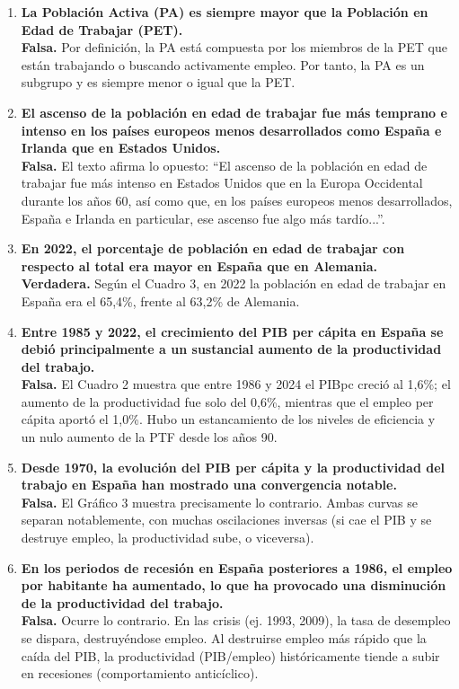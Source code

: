 \begin{enumerate}[label=\arabic*., resume=preguntas]
    \item \textbf{La Población Activa (PA) es siempre mayor que la Población en Edad de Trabajar (PET).} \\
    \textbf{Falsa.} Por definición, la PA está compuesta por los miembros de la PET que están trabajando o buscando activamente empleo. Por tanto, la PA es un subgrupo y es siempre menor o igual que la PET.

    \item \textbf{El ascenso de la población en edad de trabajar fue más temprano e intenso en los países europeos menos desarrollados como España e Irlanda que en Estados Unidos.} \\
    \textbf{Falsa.} El texto afirma lo opuesto: ``El ascenso de la población en edad de trabajar fue más intenso en Estados Unidos que en la Europa Occidental durante los años 60, así como que, en los países europeos menos desarrollados, España e Irlanda en particular, ese ascenso fue algo más tardío...''.

    \item \textbf{En 2022, el porcentaje de población en edad de trabajar con respecto al total era mayor en España que en Alemania.} \\
    \textbf{Verdadera.} Según el Cuadro 3, en 2022 la población en edad de trabajar en España era el 65,4\%, frente al 63,2\% de Alemania.

    \item \textbf{Entre 1985 y 2022, el crecimiento del PIB per cápita en España se debió principalmente a un sustancial aumento de la productividad del trabajo.} \\
    \textbf{Falsa.} El Cuadro 2 muestra que entre 1986 y 2024 el PIBpc creció al 1,6\%; el aumento de la productividad fue solo del 0,6\%, mientras que el empleo per cápita aportó el 1,0\%. Hubo un estancamiento de los niveles de eficiencia y un nulo aumento de la PTF desde los años 90.

    \item \textbf{Desde 1970, la evolución del PIB per cápita y la productividad del trabajo en España han mostrado una convergencia notable.} \\
    \textbf{Falsa.} El Gráfico 3 muestra precisamente lo contrario. Ambas curvas se separan notablemente, con muchas oscilaciones inversas (si cae el PIB y se destruye empleo, la productividad sube, o viceversa).

    \item \textbf{En los periodos de recesión en España posteriores a 1986, el empleo por habitante ha aumentado, lo que ha provocado una disminución de la productividad del trabajo.} \\
    \textbf{Falsa.} Ocurre lo contrario. En las crisis (ej. 1993, 2009), la tasa de desempleo se dispara, destruyéndose empleo. Al destruirse empleo más rápido que la caída del PIB, la productividad (PIB/empleo) históricamente tiende a subir en recesiones (comportamiento anticíclico).


\end{enumerate}
